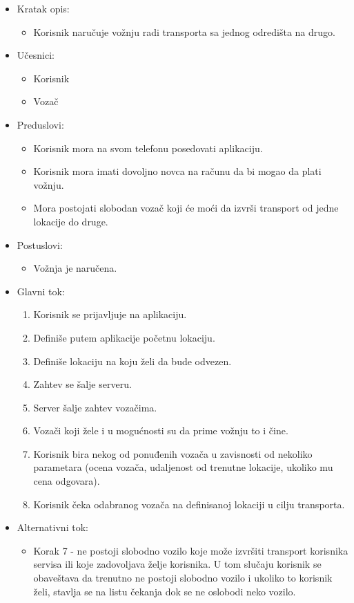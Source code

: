 \begin{itemize}
	\item Kratak opis:
		\begin{itemize}
			\item Korisnik naručuje vožnju radi transporta sa jednog odredišta na drugo.
		\end{itemize}
	\item Učesnici:
		\begin{itemize}
			\item Korisnik
		    \item Vozač
		\end{itemize}				
	\item Preduslovi:
		\begin{itemize}
		    \item Korisnik mora na svom telefonu posedovati aplikaciju.
		    \item Korisnik mora imati dovoljno novca na računu da bi mogao da plati vožnju.
		    \item Mora postojati slobodan vozač koji će moći da izvrši transport od jedne lokacije do druge.
		\end{itemize}
	\item Postuslovi:
		\begin{itemize}
			\item Vožnja je naručena.
		\end{itemize}		
	\item Glavni tok:
		\begin{enumerate}
		    \item Korisnik se prijavljuje na aplikaciju.
		    \item Definiše putem  aplikacije  početnu lokaciju.
		    \item Definiše lokaciju na koju želi da bude odvezen.
		    \item Zahtev se šalje serveru.
		    \item Server šalje zahtev vozačima.
		    \item Vozači koji žele i u mogućnosti su da prime vožnju to i čine.
		    \item Korisnik bira nekog od ponuđenih vozača u zavisnosti od nekoliko parametara (ocena vozača, udaljenost od trenutne lokacije, ukoliko mu cena odgovara).
		    \item Korisnik čeka odabranog vozača na definisanoj lokaciji u cilju transporta.
		\end{enumerate}
	\item Alternativni tok:
		\begin{itemize}
    		\item Korak 7 - ne postoji slobodno vozilo koje može izvršiti transport korisnika servisa ili koje zadovoljava želje korisnika. U tom slučaju korisnik se obaveštava da trenutno ne postoji slobodno vozilo i ukoliko to korisnik želi, stavlja se na listu čekanja dok se ne oslobodi neko vozilo.
		\end{itemize}
\end{itemize}


